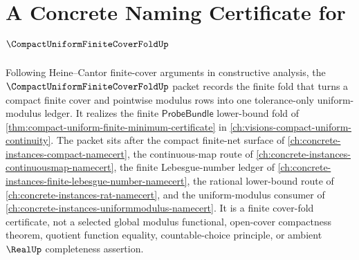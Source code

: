 \chapter{A Concrete Naming Certificate for $\CompactUniformFiniteCoverFoldUp$}
\label{ch:concrete-instances-compact-uniform-finite-cover-fold-namecert}

Following Heine--Cantor finite-cover arguments in constructive analysis, the $\CompactUniformFiniteCoverFoldUp$ packet records the finite fold that turns a compact finite cover and pointwise modulus rows into one tolerance-only uniform-modulus ledger. It realizes the finite $\mathsf{ProbeBundle}$ lower-bound fold of \autoref{thm:compact-uniform-finite-minimum-certificate} in \autoref{ch:visions-compact-uniform-continuity}. The packet sits after the compact finite-net surface of \autoref{ch:concrete-instances-compact-namecert}, the continuous-map route of \autoref{ch:concrete-instances-continuousmap-namecert}, the finite Lebesgue-number ledger of \autoref{ch:concrete-instances-finite-lebesgue-number-namecert}, the rational lower-bound route of \autoref{ch:concrete-instances-rat-namecert}, and the uniform-modulus consumer of \autoref{ch:concrete-instances-uniformmodulus-namecert}. It is a finite cover-fold certificate, not a selected global modulus functional, open-cover compactness theorem, quotient function equality, countable-choice principle, or ambient $\RealUp$ completeness assertion.

